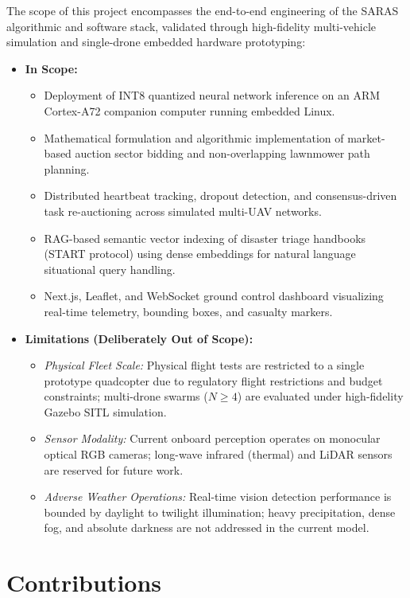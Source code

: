 The scope of this project encompasses the end-to-end engineering of the SARAS algorithmic and software stack, validated through high-fidelity multi-vehicle simulation and single-drone embedded hardware prototyping:
\begin{itemize}
    \item \textbf{In Scope:}
    \begin{itemize}
        \item Deployment of INT8 quantized neural network inference on an ARM Cortex-A72 companion computer running embedded Linux.
        \item Mathematical formulation and algorithmic implementation of market-based auction sector bidding and non-overlapping lawnmower path planning.
        \item Distributed heartbeat tracking, dropout detection, and consensus-driven task re-auctioning across simulated multi-UAV networks.
        \item RAG-based semantic vector indexing of disaster triage handbooks (START protocol) using dense embeddings for natural language situational query handling.
        \item Next.js, Leaflet, and WebSocket ground control dashboard visualizing real-time telemetry, bounding boxes, and casualty markers.
    \end{itemize}
    \item \textbf{Limitations (Deliberately Out of Scope):}
    \begin{itemize}
        \item \textit{Physical Fleet Scale:} Physical flight tests are restricted to a single prototype quadcopter due to regulatory flight restrictions and budget constraints; multi-drone swarms ($N \ge 4$) are evaluated under high-fidelity Gazebo SITL simulation.
        \item \textit{Sensor Modality:} Current onboard perception operates on monocular optical RGB cameras; long-wave infrared (thermal) and LiDAR sensors are reserved for future work.
        \item \textit{Adverse Weather Operations:} Real-time vision detection performance is bounded by daylight to twilight illumination; heavy precipitation, dense fog, and absolute darkness are not addressed in the current model.
    \end{itemize}
\end{itemize}

\section{Contributions}

